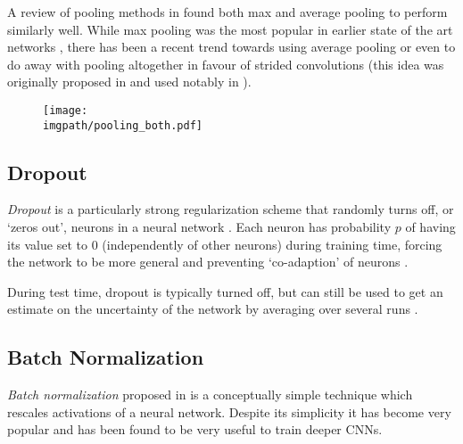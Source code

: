 A review of pooling methods in \cite{mishkin_systematic_2016} found both
max and average pooling to perform similarly well. While max pooling was the most
popular in earlier state of the art networks \cite{krizhevsky_imagenet_2012,
simonyan_very_2014}, there has been a recent trend towards using average pooling
\cite{huang_densely_2017} or even to do away with pooling altogether in favour
of strided convolutions (this idea was originally proposed in
\cite{springenberg_striving_2014-3} and used notably in \cite{he_deep_2016,
xie_aggregated_2017, zagoruyko_wide_2016-1}).

\begin{figure}
  \centering
  \texttt{[image: \\imgpath/pooling\_both.pdf]}
  \label{fig:ch2:maxpool}
\end{figure}

\subsection{Dropout}
\emph{Dropout} is a particularly strong regularization scheme that randomly turns off,
or `zeros out', neurons in a neural network \cite{hinton_improving_2012, srivastava_dropout:_2014}.
Each neuron has probability $p$ of having its value set to 0 (independently of
other neurons) during training
time, forcing the network to be more general and preventing `co-adaption' of
neurons \cite{srivastava_dropout:_2014}.

During test time, dropout is typically turned off, but can still be
used to get an estimate on the uncertainty of the network by averaging over
several runs \cite{gal_dropout_2016}.

\subsection{Batch Normalization}
\emph{Batch normalization} proposed in \cite{ioffe_batch_2015} is a conceptually
simple technique which rescales activations of a neural network. Despite its
simplicity it has become very popular and has been found to be very useful to
train deeper CNNs.


